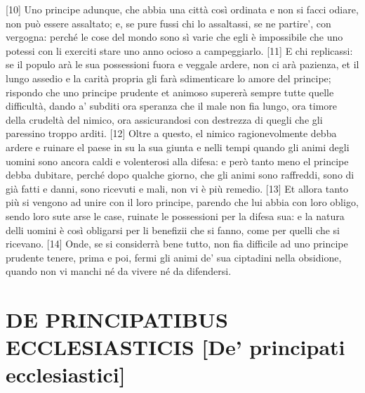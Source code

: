 {[}10{]} Uno principe adunque, che abbia una città così ordinata e non
si facci odiare, non può essere assaltato; e, se pure fussi chi lo
assaltassi, se ne partire', con vergogna: perché le cose del mondo sono
sì varie che egli è impossibile che uno potessi con li exerciti stare
uno anno ocioso a campeggiarlo. {[}11{]} E chi replicassi: se il populo
arà le sua possessioni fuora e veggale ardere, non ci arà pazienza, et
il lungo assedio e la carità propria gli farà sdimenticare lo amore del
principe; rispondo che uno principe prudente et animoso supererà sempre
tutte quelle difficultà, dando a' subditi ora speranza che il male non
fia lungo, ora timore della crudeltà del nimico, ora assicurandosi con
destrezza di quegli che gli paressino troppo arditi. {[}12{]} Oltre a
questo, el nimico ragionevolmente debba ardere e ruinare el paese in su
la sua giunta e nelli tempi quando gli animi degli uomini sono ancora
caldi e volenterosi alla difesa: e però tanto meno el principe debba
dubitare, perché dopo qualche giorno, che gli animi sono raffreddi, sono
di già fatti e danni, sono ricevuti e mali, non vi è più remedio.
{[}13{]} Et allora tanto più si vengono ad unire con il loro principe,
parendo che lui abbia con loro obligo, sendo loro sute arse le case,
ruinate le possessioni per la difesa sua: e la natura delli uomini è
così obligarsi per li benefizii che si fanno, come per quelli che si
ricevano. {[}14{]} Onde, se si considerrà bene tutto, non fia difficile
ad uno principe prudente tenere, prima e poi, fermi gli animi de' sua
ciptadini nella obsidione, quando non vi manchi né da vivere né da
difendersi.

\quebra\section{DE PRINCIPATIBUS ECCLESIASTICIS\break
{[}De' principati ecclesiastici{]}}

